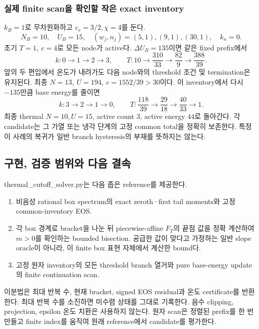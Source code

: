 \documentclass[11pt,a4paper]{article}
\providecommand{\tightlist}{\setlength{\itemsep}{2pt}\setlength{\parskip}{0pt}}
\begin{document}
\hypertarget{uxc2e4uxc81c-finite-scanuxc744-uxd655uxc778uxd560-uxc791uxc740-exact-inventory}{%
\subsubsection{실제 finite scan을 확인할 작은 exact inventory}\label{uxc2e4uxc81c-finite-scanuxc744-uxd655uxc778uxd560-uxc791uxc740-exact-inventory}}

\(k_B=1\)로 무차원화하고 \(c_v=3/2,\chi=4\)를 둔다. \[
N_B=10,\quad U_B=15,\quad
(w_j,n_j)=(5,1),(9,1),(30,1),\quad k_n=0 .
\tag{TCF.44}
\] 초기 \(T=1,\ c=4\)로 모든 node가 active다. \(\Delta U_B=135\)이면 같은 fixed prefix에서 \[
k:0\to1\to2\to3,\qquad
T:10\to\frac{310}{33}\to\frac{82}{9}\to\frac{388}{39}.
\tag{TCF.45}
\] 앞의 두 편입에서 온도가 내려가도 다음 node와의 threshold 조건 및 termination은 유지된다. 최종 \(N=13,\ U=194,\ c=1552/39>30\)이다. 이 inventory에서 다시 \(-135\)만큼 base energy를 줄이면 \[
k:3\to2\to1\to0,\qquad
T:\frac{118}{39}\to\frac{29}{18}\to\frac{40}{33}\to1 .
\tag{TCF.46}
\] 최종 thermal \(N=10,U=15\), active count \(3\), active energy \(44\)로 돌아간다. 각 candidate는 그 가열 또는 냉각 단계의 고정 common total을 정확히 보존한다. 특정 이 사례의 복귀가 일반 branch hysteresis의 부재를 뜻하지는 않는다.

\hypertarget{uxad6cuxd604-uxac80uxc99d-uxbc94uxc704uxc640-uxb2e4uxc74c-uxacb0uxc18d}{%
\subsection{구현, 검증 범위와 다음 결속}\label{uxad6cuxd604-uxac80uxc99d-uxbc94uxc704uxc640-uxb2e4uxc74c-uxacb0uxc18d}}

thermal\_cutoff\_solver.py는 다음 좁은 reference를 제공한다.

\begin{enumerate}
\def\labelenumi{\arabic{enumi}.}
\tightlist
\item
  비음성 rational box spectrum의 exact zeroth·first tail moments와 고정 common-inventory EOS.
\item
  각 box 경계로 bracket을 나눈 뒤 piecewise-affine \(F_T\)의 끝점 값을 정확 계산하여 \(m>0\)를 확인하는 bounded bisection. 공급한 값이 맞다고 가정하는 일반 slope oracle이 아니라, 이 finite box 표현 자체에서 계산한 bound다.
\item
  고정 원자 inventory의 모든 threshold branch 열거와 pure base-energy update의 finite continuation scan.
\end{enumerate}

이분법은 최대 반복 수, 현재 bracket, signed EOS residual과 온도 certificate를 반환한다. 최대 반복 수를 소진하면 미수렴 상태를 그대로 기록한다. 음수 clipping, projection, epsilon 온도 치환은 사용하지 않는다. 원자 scan은 정렬된 prefix를 한 번 만들고 finite index를 움직여 원래 reference에서 candidate를 평가한다.
\end{document}
